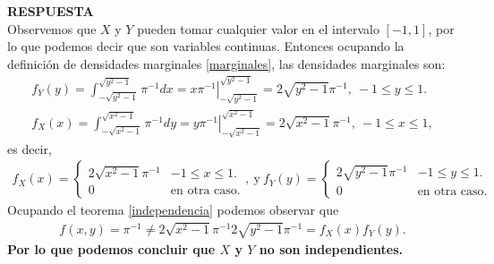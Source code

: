 \documentclass[11pt,letterpaper]{article}
\newcommand{\res}{\textbf{RESPUESTA}\\}
\newcommand{\fx}{f_X(x)}
\newcommand{\fy}{f_Y(y)}
\begin{document}
\res Observemos que $X$ y $Y$ pueden tomar cualquier valor en el intervalo $[-1,1]$, por lo que podemos decir que son variables continuas. Entonces ocupando la definición de densidades marginales \ref{marginales}, las densidades marginales son:
\begin{align*}
\fy=\int_{-\sqrt{y^2-1}}^{\sqrt{y^2-1}}\pi^{-1} dx=\left.x\pi^{-1} \right|_{-\sqrt{y^2-1}}^{\sqrt{y^2-1}}=2\sqrt{y^2-1}\pi^{-1}, \ -1\leq y \leq 1.\\
\fx=\int_{-\sqrt{x^2-1}}^{\sqrt{x^2-1}}\pi^{-1} dy=\left.y\pi^{-1} \right|_{-\sqrt{x^2-1}}^{\sqrt{x^2-1}}=2\sqrt{x^2-1}\pi^{-1}, \ -1\leq x \leq 1,
\end{align*}
es decir, 
\begin{align*}
\fx=\left\{ \begin{array}{cc}
2\sqrt{x^2-1}\pi^{-1} & -1\leq x \leq 1.\\
0 & \text{en otra caso.}
\end{array} \right., \ \text{y}\ \fy=\left\{ \begin{array}{cc}
2\sqrt{y^2-1}\pi^{-1} & -1\leq y \leq 1.\\
0 & \text{en otra caso.}
\end{array} \right.
\end{align*}
Ocupando el teorema \ref{independencia} podemos observar que
\begin{align*}
f(x,y)=\pi^{-1}\neq 2\sqrt{x^2-1}\pi^{-1} 2\sqrt{y^2-1}\pi^{-1} =\fx \fy.
\end{align*}
\textbf{Por lo que podemos concluir que $X$ y $Y$ no son independientes.}\\ 
\end{document}
